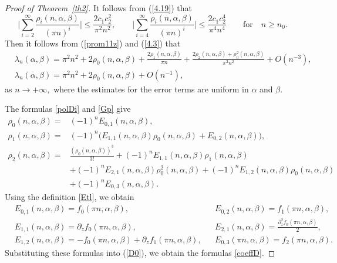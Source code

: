 \documentclass[10pt, a4paper]{article}
\theoremstyle{plain}
\theoremstyle{definition}
\numberwithin{equation}{section}
\def\l{\lambda}
\def\a{\alpha}
\def\b{\beta}
\begin{document}
\begin{proof}[Proof of Theorem~\ref{th2}]
 It follows from  (\ref{4.19})  that
\begin{equation*}%
\bigg|\sum\limits_{i=2}^{\infty} \frac{\rho_i(n,\alpha, \beta)}{(\pi n)^i}\bigg| \leqslant \frac{2c_{1}c_{2}^2}{\pi^2 n^2},\qquad \bigg|\sum\limits_{i=4}^{\infty} \frac{\rho_i(n,\alpha, \beta)}{(\pi n)^i}\bigg| \leqslant \frac{2c_{1}c_{2}^4}{\pi^4 n^4}\qquad\text{for}\quad n\geqslant n_0.
\end{equation*}
Then it follows from  (\ref{prom11z}) and (\ref{4.3}) that
\begin{align}\label{5.2}
&\l_n(\a,\b)=\pi^2 n^2 + 2\rho_0(n,\a,\b)+\frac{2\rho_1(n,\a,\b)}{\pi n} + \frac{2\rho_2(n,\a,\b)+\rho_0^2(n,\a,\b)}{\pi^2 n^2}+O(n^{-3}),
\\
&\l_n(\a,\b)=\pi^2 n^2 + 2\rho_0(n,\a,\b)+ O(n^{-1}),  \label{5.3}
\end{align}
as $n\to+\infty,$ where the estimates for the error terms are uniform in $\a$ and $\b.$




The formulas   \eqref{polDi} and \eqref{Gp} give
\begin{equation}\label{D0}
\begin{aligned}
\rho_0(n,\alpha, \beta) =&(-1)^nE_{0, 1}(n,\a,\b),
\\
\rho_1(n,\alpha, \beta) =&(-1)^n\big(E_{1, 1}(n,\a,\b)\rho_0(n,\alpha, \beta)
+E_{0, 2}(n,\a,\b)\big), \\
\rho_2(n,\a,\b) =& \frac{(\rho_0(n,\alpha, \beta))^3}{3!}
 +(-1)^n  E_{1, 1}(n,\a,\b)\rho_1(n,\alpha, \beta)
\\
&+(-1)^n E_{2, 1}(n,\a,\b) \rho_0^2(n,\alpha, \beta)
+(-1)^n E_{1, 2}(n,\a,\b)\rho_0(n,\alpha, \beta)
\\
&+(-1)^n E_{0, 3}(n,\a,\b).
\end{aligned}
\end{equation}
Using the definition \eqref{Etl}, we obtain
\begin{align*}
&E_{0, 1}(n,\a,\b)=f_0(\pi n,\a,\b), &&
E_{0, 2}(n,\a,\b)= f_1(\pi n,\a,\b),
\\
&E_{1, 1}(n,\a,\b)=\partial_z f_0(\pi n,\a,\b),  &&
E_{2, 1}(n,\a,\b)=\frac{\partial_z^2f_0(\pi n,\alpha,\beta)}{2},
\\
&E_{1, 2}(n,\a,\b)= -f_0(\pi n, \alpha, \beta)
+ \partial_z f_1(\pi n,\a,\b), && E_{0, 3}(\pi n,\a,\b)=f_2(\pi n,\a,\b).
\end{align*}
Substituting these formulas into (\ref{D0}), we obtain
  the formulas \eqref{coeffD}.



\end{proof}
\end{document}
